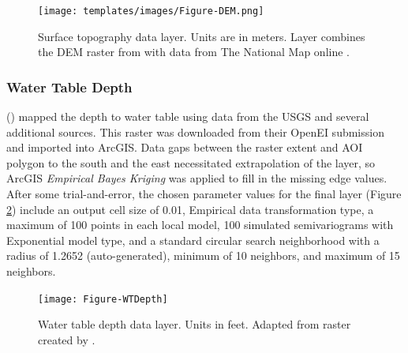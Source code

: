 \begin{figure}[!htp]
\centering
\texttt{[image: templates/images/Figure-DEM.png]}
\caption[Surface topography data layer]{Surface topography data layer. Units are in meters. Layer combines the DEM raster from \citep{bielicki_hydrogeolgic_2015} with data from The National Map online \citep{usgs_tnm_2021}.}
\label{fig:feat_dem}
\end{figure}

\subsubsection{Water Table Depth}

\citeauthor{bielicki_hydrogeolgic_2015} (\citeyear{bielicki_hydrogeolgic_2015}) mapped the depth to water table using data from the USGS and several additional sources. This raster was downloaded from their OpenEI submission \citep{kelley_geothermal_2015} and imported into ArcGIS. Data gaps between the raster extent and AOI polygon to the south and the east necessitated extrapolation of the layer, so ArcGIS \textit{Empirical Bayes Kriging} was applied to fill in the missing edge values. After some trial-and-error, the chosen parameter values for the final layer (Figure \ref{fig:feat_wtdepth}) include an output cell size of 0.01, Empirical data transformation type, a maximum of 100 points in each local model, 100 simulated semivariograms with Exponential model type, and a standard circular search neighborhood with a radius of 1.2652 (auto-generated), minimum of 10 neighbors, and maximum of 15 neighbors.

\begin{figure}[!htp]
\centering
\texttt{[image: Figure-WTDepth]}
\caption[Water table depth data layer]{Water table depth data layer. Units in feet. Adapted from raster created by \protect\citep{bielicki_hydrogeolgic_2015}.}
\label{fig:feat_wtdepth}
\end{figure}